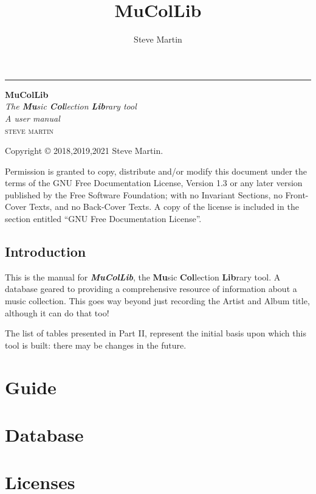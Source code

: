 \documentclass[12pt,a4paper,final,twoside,titlepage]{book}
\author{\LARGE Steve Martin}
\title{\Huge MuColLib}
\begin{document}
\begin{titlepage} %
	\raggedleft
	\rule{1pt}{\textheight} %
	\hspace{0.05\textwidth} %
	\parbox[b]{0.75\textwidth}{ %
		{\Huge\bfseries MuColLib}\\[2\baselineskip] %
		{\large\textit{The \textbf{Mu}sic \textbf{Col}lection \textbf{Lib}rary tool}}\\
		{\large\textit{A user manual}}\\[4\baselineskip] %
		{\Large\textsc{steve martin}} %
		\vspace{0.5\textheight} %
	}
\end{titlepage}
\thispagestyle{empty}
\null
\vfill
\bigskip
\begin{center}
Copyright \copyright{} 2018,2019,2021  Steve Martin.\\
\end{center}
Permission is granted to copy, distribute and/or modify this document
under the terms of the GNU Free Documentation License, Version 1.3
or any later version published by the Free Software Foundation;
with no Invariant Sections, no Front-Cover Texts, and no Back-Cover Texts.
A copy of the license is included in the section entitled ``GNU
Free Documentation License''.
\bigskip
\frontmatter
\tableofcontents
\listoffigures
\listoftables
\newpage
\chapter{Introduction}
This is the manual for \textbf{\textit{MuColLib}}, the \textbf{Mu}sic \textbf{Col}lection \textbf{Lib}rary tool. A database geared to providing a comprehensive resource of information about a music collection.  This goes way beyond just recording the Artist and Album title, although it can do that too!

The list of tables presented in Part II, represent the initial basis upon which this tool is built: there may be changes in the future.
 
\mainmatter
\part{Guide}



\part{Database}

\part{Licenses}


\end{document}
